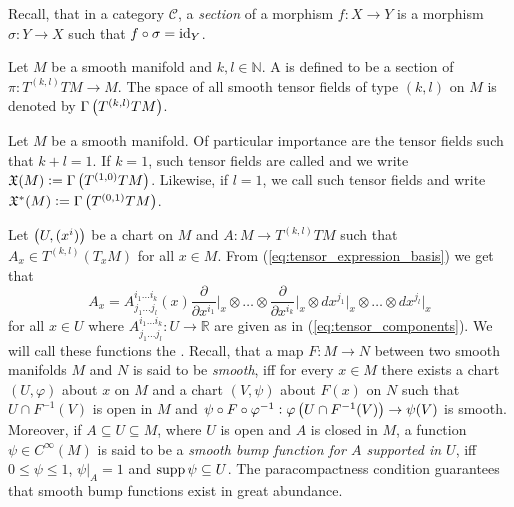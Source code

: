 Recall, that in a category $\mathcal{C}$, a \emph{section} of a morphism $f : X \to Y$ is a morphism $\sigma : Y \to X$ such that $f \circ \sigma = \operatorname{id}_Y$.

\begin{definition}
	Let $M$ be a smooth manifold and $k,l \in \mathbb{N}$. A  is defined to be a section of $\pi : T^{(k,l)}TM \to M$. The space of all smooth tensor fields of type $(k,l)$ on $M$ is denoted by $\Gamma\del[1]{T^{(k,l)}TM}$.
\end{definition}

\begin{example}
	\label{ex:vector_and_covector_fields}
	Let $M$ be a smooth manifold. Of particular importance are the tensor fields such that $k + l = 1$. If $k = 1$, such tensor fields are called  and we write $\mathfrak{X}(M) := \Gamma\del[1]{T^{(1,0)}TM}$. Likewise, if $l = 1$, we call such tensor fields  and write $\mathfrak{X}^*(M) := \Gamma\del[1]{T^{(0,1)}TM}$.
\end{example}

Let $\del[1]{U,(x^i)}$ be a chart on $M$ and $A : M \to T^{(k,l)}TM$ such that $A_x \in T^{(k,l)}(T_xM)$ for all $x \in M$. From (\ref{eq:tensor_expression_basis}) we get that
\begin{equation*}
	A_x = A^{i_1\dots i_k}_{j_1\dots j_l}(x)\frac{\partial}{\partial x^{i_1}}\bigg\vert_x \otimes \dots \otimes \frac{\partial}{\partial x^{i_k}}\bigg\vert_x \otimes dx^{j_1}\vert_x \otimes \dots \otimes dx^{j_l}\vert_x
\end{equation*}
\noindent for all $x \in U$ where $A^{i_1\dots i_k}_{j_1\dots j_l} : U \to \mathbb{R}$ are given as in (\ref{eq:tensor_components}). We will call these functions the . Recall, that a map $F : M \to N$ between two smooth manifolds $M$ and $N$ is said to be \emph{smooth}, iff for every $x \in M$ there exists a chart $(U,\varphi)$ about $x$ on $M$ and a chart $(V,\psi)$ about $F(x)$ on $N$ such that $U \cap F^{-1}(V)$ is open in $M$ and $\psi \circ F \circ \varphi^{-1} : \varphi\del[1]{U \cap F^{-1}(V)} \to \psi(V)$ is smooth. Moreover, if $A \subseteq U \subseteq M$, where $U$ is open and $A$ is closed in $M$, a function $\psi \in C^\infty(M)$ is said to be a \emph{smooth bump function for $A$ supported in $U$}, iff $0 \leq \psi \leq 1$, $\psi \vert_A = 1$ and $\operatorname{supp} \psi \subseteq U$. The paracompactness condition guarantees that smooth bump functions exist in great abundance.

